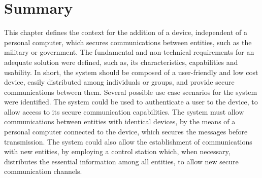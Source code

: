 \section*{Summary}\label{chap:problem:summary}

This chapter defines the context for the addition of a device, independent of a personal computer, which secures communications between entities, such as the military or government.
The fundamental and non-technical requirements for an adequate solution were defined, such as, its characteristics, capabilities and usability. In short, the system should be composed of a user-friendly and low cost device, easily distributed among individuals or groups, and provide secure communications between them.
Several possible use case scenarios for the system were identified.
The system could be used to authenticate a user to the device, to allow access to its secure communication capabilities. The system must allow communications between entities with identical devices, by the means of a personal computer connected to the device, which secures the messages before transmission.
The system could also allow the establishment of communications with new entities, by employing a control station which, when necessary, distributes the essential information among all entities, to allow new secure communication channels.
